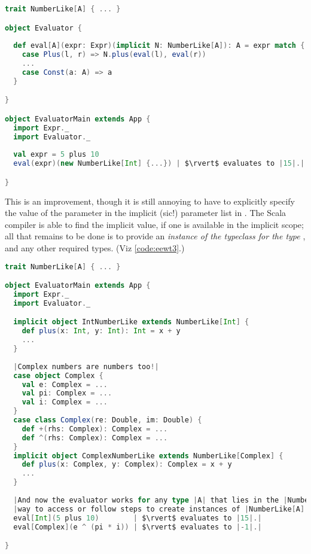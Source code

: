 \documentclass[10 pt]{article}
\begin{document}
\begin{lstlisting}[caption={Expression evaluator with typeclasses-ish}, label={code:eewt2}, language=Scala, escapechar=|]
trait NumberLike[A] { ... }

object Evaluator {
 
  def eval[A](expr: Expr)(implicit N: NumberLike[A]): A = expr match {
    case Plus(l, r) => N.plus(eval(l), eval(r))
    ...
    case Const(a: A) => a
  }

}

object EvaluatorMain extends App {
  import Expr._
  import Evaluator._
  
  val expr = 5 plus 10
  eval(expr)(new NumberLike[Int] {...}) | $\rvert$ evaluates to |15|.|

}
\end{lstlisting}

This is an improvement, though it is still annoying to have to explicitly specify the value of the  parameter in the implicit (sic!) parameter list in . The Scala compiler is able to find the implicit value, if one is available in the implicit scope; all that remains to be done is to provide an \emph{instance of the  typeclass for the type }, and any other required types. (Viz \autoref{code:eewt3}.)

\begin{lstlisting}[caption={Expression evaluator with typeclasses}, label={code:eewt3}, language=Scala, escapechar=|]
trait NumberLike[A] { ... }

object EvaluatorMain extends App {
  import Expr._
  import Evaluator._

  implicit object IntNumberLike extends NumberLike[Int] {
    def plus(x: Int, y: Int): Int = x + y
    ...
  }
  
  |Complex numbers are numbers too!|
  case object Complex {
    val e: Complex = ...
    val pi: Complex = ...
    val i: Complex = ...
  }
  case class Complex(re: Double, im: Double) {
    def +(rhs: Complex): Complex = ...
    def ^(rhs: Complex): Complex = ...
  }
  implicit object ComplexNumberLike extends NumberLike[Complex] {
    def plus(x: Complex, y: Complex): Complex = x + y
    ...
  }
  
  |And now the evaluator works for any type |A| that lies in the |NumberLike| typeclass; i.e. where there is an in-scope|
  |way to access or follow steps to create instances of |NumberLike[A]|.|
  eval[Int](5 plus 10)        | $\rvert$ evaluates to |15|.|
  eval[Complex](e ^ (pi * i)) | $\rvert$ evaluates to |-1|.|

}
\end{lstlisting}
\end{document}
